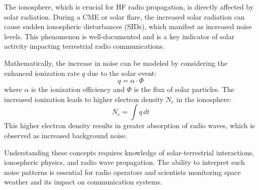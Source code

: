 The ionosphere, which is crucial for HF radio propagation, is directly affected by solar radiation. During a CME or solar flare, the increased solar radiation can cause sudden ionospheric disturbances (SIDs), which manifest as increased noise levels. This phenomenon is well-documented and is a key indicator of solar activity impacting terrestrial radio communications.

Mathematically, the increase in noise can be modeled by considering the enhanced ionization rate \( q \) due to the solar event:
\[ q = \alpha \cdot \Phi \]
where \( \alpha \) is the ionization efficiency and \( \Phi \) is the flux of solar particles. The increased ionization leads to higher electron density \( N_e \) in the ionosphere:
\[ N_e = \int q \, dt \]
This higher electron density results in greater absorption of radio waves, which is observed as increased background noise.

Understanding these concepts requires knowledge of solar-terrestrial interactions, ionospheric physics, and radio wave propagation. The ability to interpret such noise patterns is essential for radio operators and scientists monitoring space weather and its impact on communication systems.

